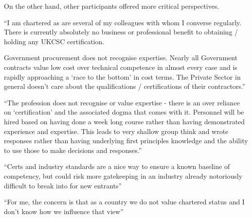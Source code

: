 \documentclass[
  a4paper,
]{book}
\begin{document}
On the other hand, other participants offered more critical
perspectives.

\begin{tcolorbox}[enhanced jigsaw, leftrule=.75mm, colframe=quarto-callout-note-color-frame, opacityback=0, breakable, left=2mm, rightrule=.15mm, bottomrule=.15mm, colback=white, arc=.35mm, toprule=.15mm]

``I am chartered as are several of my colleagues with whom I converse
regularly. There is currently absolutely no business or professional
benefit to obtaining / holding any UKCSC certification.

Government procurement does not recognise expertise. Nearly all
Government contracts value low cost over technical competence in almost
every case and is rapidly approaching a `race to the bottom' in cost
terms. The Private Sector in general doesn't care about the
qualifications / certifications of their contractors.''

\end{tcolorbox}

\begin{tcolorbox}[enhanced jigsaw, leftrule=.75mm, colframe=quarto-callout-note-color-frame, opacityback=0, breakable, left=2mm, rightrule=.15mm, bottomrule=.15mm, colback=white, arc=.35mm, toprule=.15mm]

``The profession does not recognise or value expertise - there is an
over reliance on `certification' and the associated dogma that comes
with it. Personnel will be hired based on having done a week long course
rather than having demonstrated experience and expertise. This leads to
very shallow group think and wrote responses rather than having
underlying first principles knowledge and the ability to use those to
make decisions and responses.''

\end{tcolorbox}

\begin{tcolorbox}[enhanced jigsaw, leftrule=.75mm, colframe=quarto-callout-note-color-frame, opacityback=0, breakable, left=2mm, rightrule=.15mm, bottomrule=.15mm, colback=white, arc=.35mm, toprule=.15mm]

``Certs and industry standards are a nice way to ensure a known baseline
of competency, but could risk more gatekeeping in an industry already
notoriously difficult to break into for new entrants''

\end{tcolorbox}

\begin{tcolorbox}[enhanced jigsaw, leftrule=.75mm, colframe=quarto-callout-note-color-frame, opacityback=0, breakable, left=2mm, rightrule=.15mm, bottomrule=.15mm, colback=white, arc=.35mm, toprule=.15mm]

``For me, the concern is that as a country we do not value chartered
status and I don't know how we influence that view''

\end{tcolorbox}
\end{document}
